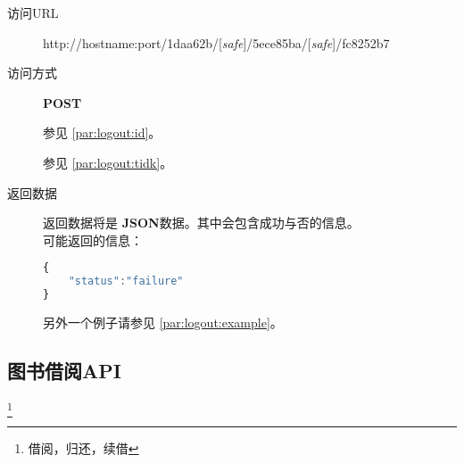 \documentclass[UTF8]{article}
\def\safe{/[\textit{safe}]}
\def\POST{\colorbox[rgb]{0.77,0.53,0.97}{\textbf{POST}}}
\def\bfJSON{\textbf{JSON}\space}
\def\viaurl{\item[{\quad\colorbox[rgb]{0.47,0.88,0.89}{访问URL}}]}
\def\viareq#1{\item[{\quad\colorbox[rgb]{0.57,0.88,0.99}{访问方式}}] #1}
\def\rtdata{\item[{\quad\colorbox[rgb]{0.70,0.9,0.59}{返回数据}}]}
\begin{document}
        \begin{description}
            \viaurl http://hostname:port/1daa62b\safe/5ece85ba\safe/fc8252b7
            \viareq \POST

            参见 \ref{par:logout:id}。

            参见 \ref{par:logout:tidk}。


            \rtdata 返回数据将是 \bfJSON 数据。其中会包含成功与否的信息。
            \\可能返回的信息：
            \begin{lstlisting}[language=JavaScript]
{
    "status":"failure"
}
            \end{lstlisting}
            另外一个例子请参见 \ref{par:logout:example}。
        \end{description}


        \subsection{图书借阅API}
        \footnote{借阅，归还，续借}
\end{document}
